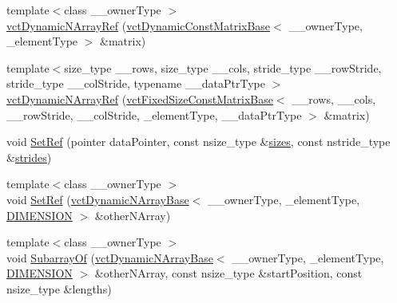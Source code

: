 \begin{DoxyCompactItemize}
\item 
{\footnotesize template$<$class \-\_\-\-\_\-owner\-Type $>$ }\\\hyperlink{classvct_dynamic_n_array_ref_affe5937295359867f76f4fd14c6814af}{vct\-Dynamic\-N\-Array\-Ref} (\hyperlink{classvct_dynamic_const_matrix_base}{vct\-Dynamic\-Const\-Matrix\-Base}$<$ \-\_\-\-\_\-owner\-Type, \-\_\-element\-Type $>$ \&matrix)
\item 
{\footnotesize template$<$size\-\_\-type \-\_\-\-\_\-rows, size\-\_\-type \-\_\-\-\_\-cols, stride\-\_\-type \-\_\-\-\_\-row\-Stride, stride\-\_\-type \-\_\-\-\_\-col\-Stride, typename \-\_\-\-\_\-data\-Ptr\-Type $>$ }\\\hyperlink{classvct_dynamic_n_array_ref_a0c88eadb91497258604c2ac6401e1dd2}{vct\-Dynamic\-N\-Array\-Ref} (\hyperlink{classvct_fixed_size_const_matrix_base}{vct\-Fixed\-Size\-Const\-Matrix\-Base}$<$ \-\_\-\-\_\-rows, \-\_\-\-\_\-cols, \-\_\-\-\_\-row\-Stride, \-\_\-\-\_\-col\-Stride, \-\_\-element\-Type, \-\_\-\-\_\-data\-Ptr\-Type $>$ \&matrix)
\item 
void \hyperlink{classvct_dynamic_n_array_ref_a395385ec68aafaea6e60af8bd330eb82}{Set\-Ref} (pointer data\-Pointer, const nsize\-\_\-type \&\hyperlink{classvct_dynamic_const_n_array_base_aa86793343d80325ba5671bc24a2e0e8f}{sizes}, const nstride\-\_\-type \&\hyperlink{classvct_dynamic_const_n_array_base_a6608baee60a448ccb9598417c487cde2}{strides})
\item 
{\footnotesize template$<$class \-\_\-\-\_\-owner\-Type $>$ }\\void \hyperlink{classvct_dynamic_n_array_ref_a8a88ecc7e2f1c68f97581955794de852}{Set\-Ref} (\hyperlink{classvct_dynamic_n_array_base}{vct\-Dynamic\-N\-Array\-Base}$<$ \-\_\-\-\_\-owner\-Type, \-\_\-element\-Type, \hyperlink{classvct_dynamic_n_array_ref_a92161a3e7a42576d3442eaf7bae097c1aa639cdab72a595c9cb324af98946bab5}{D\-I\-M\-E\-N\-S\-I\-O\-N} $>$ \&other\-N\-Array)
\item 
{\footnotesize template$<$class \-\_\-\-\_\-owner\-Type $>$ }\\void \hyperlink{classvct_dynamic_n_array_ref_a19dff24ff49164e8f01db14f6e5d421a}{Subarray\-Of} (\hyperlink{classvct_dynamic_n_array_base}{vct\-Dynamic\-N\-Array\-Base}$<$ \-\_\-\-\_\-owner\-Type, \-\_\-element\-Type, \hyperlink{classvct_dynamic_n_array_ref_a92161a3e7a42576d3442eaf7bae097c1aa639cdab72a595c9cb324af98946bab5}{D\-I\-M\-E\-N\-S\-I\-O\-N} $>$ \&other\-N\-Array, const nsize\-\_\-type \&start\-Position, const nsize\-\_\-type \&lengths)
\item 

\end{DoxyCompactItemize}
